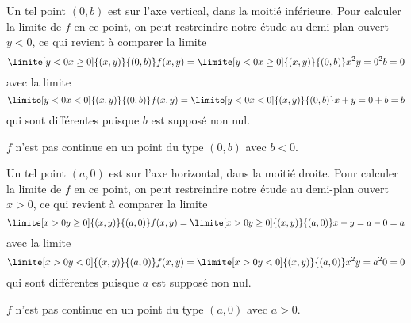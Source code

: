 \begin{example}
\begin{subproof}
    \spitem[Si \( a = 0\) et \( b < 0\)]
    Un tel point \( (0,b)\) est sur
	l'axe vertical, dans la moitié inférieure. Pour calculer la limite de
	\( f\) en ce point, on peut restreindre notre étude au demi-plan ouvert
	\( y < 0\), ce qui revient à comparer la limite
	\begin{equation*}
		\limite[y<0\\x\geq 0] {(x,y)} {(0,b)} f(x,y) =   \limite[y<0\\x\geq
			0] {(x,y)} {(0,b)} x^2 y = 0^2 b = 0
	\end{equation*}
	avec la limite
	\begin{equation*}
		\limite[y<0\\x<0] {(x,y)} {(0,b)} f(x,y) =   \limite[y<0\\x<0]
		{(x,y)} {(0,b)} x+y = 0 + b = b
	\end{equation*}
	qui sont différentes puisque \( b\) est supposé non nul.

	\conclusion \( f\) n'est pas continue en un point du type \( (0,b)\) avec \( b
	< 0\).

    \spitem[Si \( a > 0\) et \( b = 0\)]
    Un tel point \( (a,0)\) est sur
	l'axe horizontal, dans la moitié droite. Pour calculer la limite de
	\( f\) en ce point, on peut restreindre notre étude au demi-plan ouvert
	\( x > 0\), ce qui revient à comparer la limite
	\begin{equation*}
		\limite[x>0\\y \geq 0] {(x,y)} {(a,0)} f(x,y) =   \limite[x>0\\y \geq
			0] {(x,y)} {(a,0)} x-y = a - 0 = a
	\end{equation*}
	avec la limite
	\begin{equation*}
		\limite[x>0\\y < 0] {(x,y)} {(a,0)} f(x,y) =   \limite[x>0\\y < 0]
		{(x,y)} {(a,0)} x^2y = a^2 0 = 0
	\end{equation*}
	qui sont différentes puisque \( a\) est supposé non nul.

	\conclusion \( f\) n'est pas continue en un point du type \( (a,0)\) avec \( a
	> 0\).


\end{subproof}
\end{example}
